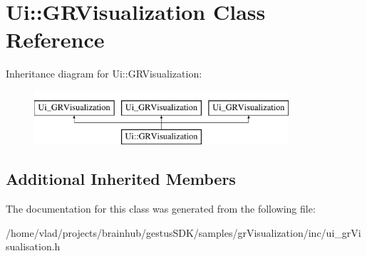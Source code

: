 \hypertarget{classUi_1_1GRVisualization}{}\section{Ui\+:\+:G\+R\+Visualization Class Reference}
\label{classUi_1_1GRVisualization}
Inheritance diagram for Ui\+:\+:G\+R\+Visualization\+:\begin{figure}[H]
\begin{center}
\leavevmode
\includegraphics[height=2.000000cm]{classUi_1_1GRVisualization}
\end{center}
\end{figure}
\subsection*{Additional Inherited Members}


The documentation for this class was generated from the following file\+:\begin{DoxyCompactItemize}
\item 
/home/vlad/projects/brainhub/gestus\+S\+D\+K/samples/gr\+Visualization/inc/ui\+\_\+gr\+Visualisation.\+h\end{DoxyCompactItemize}
